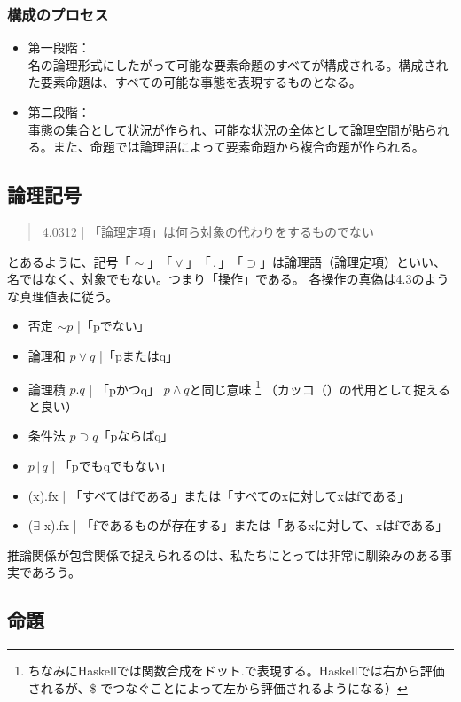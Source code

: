 \documentclass[a4paper,onecolumn,openany,article]{jsarticle}
\begin{document}
\subsubsection{構成のプロセス}

\begin{itemize}
\item 第一段階：\\ 名の論理形式にしたがって可能な要素命題のすべてが構成される。構成された要素命題は、すべての可能な事態を表現するものとなる。
\item 第二段階：\\ 事態の集合として状況が作られ、可能な状況の全体として論理空間が貼られる。また、命題では論理語によって要素命題から複合命題が作られる。

\end{itemize}


\subsection{論理記号}
\begin{quote}
  4.0312 | 「論理定項」は何ら対象の代わりをするものでない
\end{quote}
 とあるように、記号$「\sim」「\vee」 「\, . \,」 「\supset」$は論理語（論理定項）といい、名ではなく、対象でもない。つまり「操作」である。
各操作の真偽は4.3のような真理値表に従う。

\begin{itemize}
  \item 否定 $\sim p$ |「pでない」
  \item 論理和 $p\vee q$ |「pまたはq」
  \item 論理積 $p.q$ | 「pかつq」 $p \wedge q$と同じ意味 \footnote{ちなみにHaskellでは関数合成をドット$.$で表現する。Haskellでは右から評価されるが、\$ でつなぐことによって左から評価されるようになる）} （カッコ（）の代用として捉えると良い）
  \item 条件法 $p \supset q$「pならばq」
  \item $p \, | \, q$ | 「pでもqでもない」
  \item (x).fx |  「すべてはfである」または「すべてのxに対してxはfである」
  \item ($\exists$ x).fx | 「fであるものが存在する」または「あるxに対して、xはfである」
\end{itemize}

推論関係が包含関係で捉えられるのは、私たちにとっては非常に馴染みのある事実であろう。


\subsection{命題}
\end{document}
